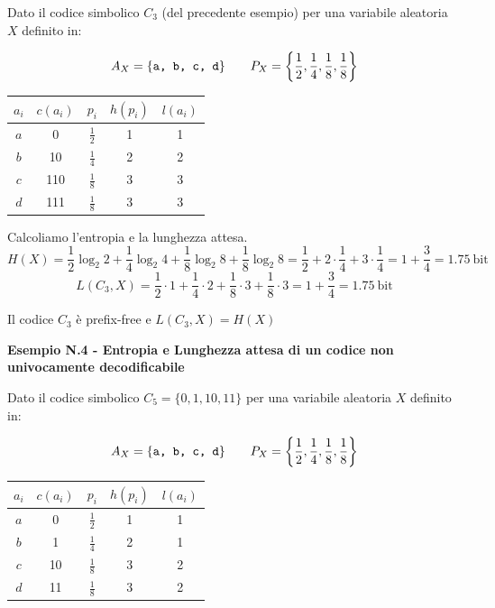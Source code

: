 Dato il codice simbolico $C_3$ (del precedente esempio) per una variabile aleatoria $X$ definito in:\\
\begin{minipage}{0.50\textwidth}
	$$
	A_X = \{\verb|a, b, c, d|\}\qquad P_X = \left\{\frac{1}{2}, \frac{1}{4}, \frac{1}{8}, \frac{1}{8}
	\right\}
	$$
\end{minipage}
\begin{minipage}{0.50\textwidth}
	\begin{table}[H]
		\centering
		\renewcommand{\arraystretch}{1.5}
		\begin{tabular}{c|c|c|c|c}
			$a_i$ & $c(a_i)$ & $p_i$ & $h(p_i)$ & $l(a_i)$ \\
			\hline
			$a$ & 0 & $\frac{1}{2}$ & 1 & 1 \\
			$b$ & 10 & $\frac{1}{4}$ & 2 & 2 \\
			$c$ & 110 & $\frac{1}{8}$ & 3 & 3 \\
			$d$ & 111 & $\frac{1}{8}$ & 3 & 3 \\
		\end{tabular}
	\end{table}
\end{minipage}

Calcoliamo l'entropia e la lunghezza attesa.
$$
H(X) = \frac{1}{2} \log_2 2+ \frac{1}{4} \log_2 4+ \frac{1}{8} \log_2 8+ \frac{1}{8} \log_2 8 = \frac{1}{2} + 2 \cdot \frac{1}{4} + 3 \cdot \frac{1}{4} = 1 + \frac{3}{4} = 1.75\ \text{bit}
$$
$$
L(C_3, X) = \frac{1}{2} \cdot 1 + \frac{1}{4} \cdot 2 + \frac{1}{8} \cdot 3 + \frac{1}{8} \cdot 3 = 1 + \frac{3}{4} = 1.75\ \text{bit}
$$

Il codice $C_3$ è prefix-free e $L(C_3, X) = H(X)$

\textbf{Esempio N.4 - Entropia e Lunghezza attesa di un codice non univocamente decodificabile}

Dato il codice simbolico $C_5 = \{0, 1, 10, 11\}$ per una variabile aleatoria $X$ definito in:\\
\begin{minipage}{0.50\textwidth}
	$$
	A_X = \{\verb|a, b, c, d|\}\qquad P_X = \left\{\frac{1}{2}, \frac{1}{4}, \frac{1}{8}, \frac{1}{8}
	\right\}
	$$
\end{minipage}
\begin{minipage}{0.50\textwidth}
	\begin{table}[H]
		\centering
		\renewcommand{\arraystretch}{1.5}
		\begin{tabular}{c|c|c|c|c}
			$a_i$ & $c(a_i)$ & $p_i$ & $h(p_i)$ & $l(a_i)$ \\
			\hline
			$a$ & 0 & $\frac{1}{2}$ & 1 & 1 \\
			$b$ & 1 & $\frac{1}{4}$ & 2 & 1 \\
			$c$ & 10 & $\frac{1}{8}$ & 3 & 2 \\
			$d$ & 11 & $\frac{1}{8}$ & 3 & 2 \\
		\end{tabular}
	\end{table}
\end{minipage}

